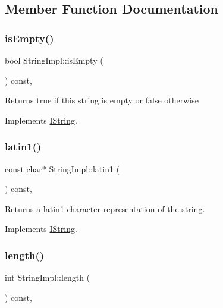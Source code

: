 \subsection{Member Function Documentation}
\mbox{\label{class_string_impl_a96cd2f042d397934171ebde8dd6f61ad}} 
\subsubsection{\texorpdfstring{isEmpty()}{isEmpty()}}
{\footnotesize\ttfamily bool String\+Impl\+::is\+Empty (\begin{DoxyParamCaption}{ }\end{DoxyParamCaption}) const\hspace{0.3cm}{\ttfamily [inline]}, {\ttfamily [virtual]}}

Returns true if this string is empty or false otherwise 

Implements \mbox{\hyperlink{class_i_string_a85fee593e5cae3324834b6c02ceb6ae1}{I\+String}}.

\mbox{\label{class_string_impl_a4a71f742026854a0941e7fa829b47203}} 
\subsubsection{\texorpdfstring{latin1()}{latin1()}}
{\footnotesize\ttfamily const char$\ast$ String\+Impl\+::latin1 (\begin{DoxyParamCaption}{ }\end{DoxyParamCaption}) const\hspace{0.3cm}{\ttfamily [inline]}, {\ttfamily [virtual]}}

Returns a latin1 character representation of the string. 

Implements \mbox{\hyperlink{class_i_string_aa4961cf1dde87d3308ec95430045b7db}{I\+String}}.

\mbox{\label{class_string_impl_a52096f97ab17336a71a81e3c81e759ca}} 
\subsubsection{\texorpdfstring{length()}{length()}}
{\footnotesize\ttfamily int String\+Impl\+::length (\begin{DoxyParamCaption}{ }\end{DoxyParamCaption}) const\hspace{0.3cm}{\ttfamily [inline]}, {\ttfamily [virtual]}}

